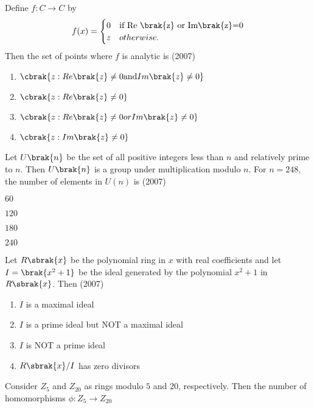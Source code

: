 	\item Define $f: C \rightarrow C$ by 
         \begin{align*}
               f(x) = 
\begin{cases} 
    0 & \text{if Re \brak{z} or Im\brak{z}=0} \\
    z & otherwise.
\end{cases}
         \end{align*}
 Then the set of points where $f$ is analytic is
 \hfill{(2007)}
		\begin{enumerate}
			\item $\cbrak{z: Re \brak{z} \neq 0 \text{and} Im \brak{z} \neq 0}$
			\item $\cbrak{z: Re\brak{z} \neq 0}$
			\item $\cbrak{z: Re \brak{z} \neq 0 or Im \brak{z} \neq 0}$
	        \item $\cbrak{z: Im \brak{z} \neq 0}$
        	\end{enumerate}
	\item Let $U\brak{n}$ be the set of all positive integers less than $n$ and relatively prime to $n$. Then $U\brak{n}$ is a group under multiplication modulo $n$. For $n=248$, the number of elements in $U(n)$ is
	\hfill{(2007)}
		\begin{enumerate}
             \begin{multicols}{4}  
		       \item $60$
		       \item $120$
		       \item $180$
		       \item $240$
             \end{multicols}
        	\end{enumerate}	
	\item Let $ R \sbrak{x}$ be the polynomial ring in $x$ with real coefficients and let $I=\brak{ x^{2}+1}$ be the ideal generated by the polynomial $x^{2}+1$ in $R\sbrak{x}$. Then
	\hfill{(2007)}
		\begin{enumerate}
			\item $I$ is a maximal ideal
			\item $I$ is a prime ideal but NOT a maximal ideal
			\item $I$ is NOT a prime ideal
			\item $R\sbrak{x} / I$ has zero divisors
        	\end{enumerate}
	\item Consider $Z_5$ and $Z_{20}$ as rings modulo $5$ and $20 $, respectively. Then the number of homomorphisms $\phi : Z_5 \rightarrow  Z_{20}$ 
